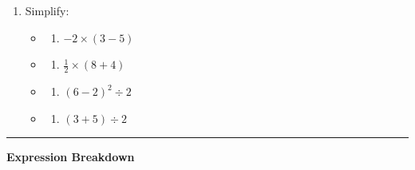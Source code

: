 \documentclass[
  letterpaper,
  DIV=11,
  numbers=noendperiod]{scrreprt}
\providecommand{\tightlist}{%
  \setlength{\itemsep}{0pt}\setlength{\parskip}{0pt}}
\begin{document}
\begin{enumerate}
\def\labelenumi{\arabic{enumi}.}
\setcounter{enumi}{1}
\item
  Simplify:

  \begin{itemize}
  \tightlist
  \item
    \begin{enumerate}
    \def\labelenumii{\alph{enumii}.}
    \tightlist
    \item
      \(-2 \times (3 - 5)\)\\
    \end{enumerate}
  \item
    \begin{enumerate}
    \def\labelenumii{\alph{enumii}.}
    \setcounter{enumii}{1}
    \tightlist
    \item
      \(\frac{1}{2} \times (8 + 4)\)\\
    \end{enumerate}
  \item
    \begin{enumerate}
    \def\labelenumii{\alph{enumii}.}
    \setcounter{enumii}{2}
    \tightlist
    \item
      \((6 - 2)^2 \div 2\)\\
    \end{enumerate}
  \item
    \begin{enumerate}
    \def\labelenumii{\alph{enumii}.}
    \setcounter{enumii}{3}
    \tightlist
    \item
      \((3 + 5) \div 2\)
    \end{enumerate}
  \end{itemize}
\end{enumerate}

\begin{center}\rule{0.5\linewidth}{0.5pt}\end{center}

\textbf{Expression Breakdown}
\end{document}
